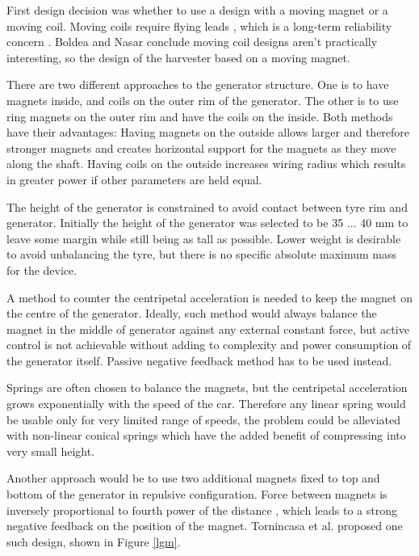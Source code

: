 First design decision was whether to use a design with a moving magnet or a moving coil. Moving coils require flying leads  \cite{Jacob2011},  which is a long-term reliability concern  \cite{Boldea1999}.  Boldea and Nasar \cite[p. 203]{Boldea1999a} conclude moving coil designs aren't practically interesting, so the design of the harvester based on a moving magnet.

There are two different approaches to the generator structure. One is to have magnets inside, and coils on the outer rim of the generator. The other is to use ring magnets on the outer rim and have the coils on the inside. Both methods have their advantages: Having magnets on the outside allows larger and therefore stronger magnets and creates horizontal support for the magnets as they move along the shaft. Having coils on the outside increases wiring radius which results in greater power if other parameters are held equal. 

The height of the generator is constrained to avoid contact between tyre rim and generator. Initially the height of the generator was selected to be 35 ... 40 mm to leave some margin while still being as tall as possible. Lower weight is desirable to avoid unbalancing the tyre, but there is no specific absolute maximum mass for the device. 

A method to counter the centripetal acceleration is needed to keep the magnet on the centre of the generator. Ideally, such method would always balance the magnet in the middle of generator against any external constant force, but active control is not achievable without adding to complexity and power consumption of the generator itself. Passive negative feedback method has to be used instead. 

Springs are often chosen to balance the magnets, but the centripetal acceleration grows exponentially with the speed of the car. Therefore any linear spring would be usable only for very limited range of speeds, the problem could be alleviated with non-linear conical springs which have the added benefit of compressing into very small height.

Another approach would be to use two additional magnets fixed to top and bottom of the generator in repulsive configuration. Force between magnets is inversely proportional to fourth power of the distance \cite{Amrani2015}, which leads to a strong negative feedback on the position of the magnet. Tornincasa et al. \cite{Tornincasa2012} proposed one such design, shown in Figure \ref{lgm}.

